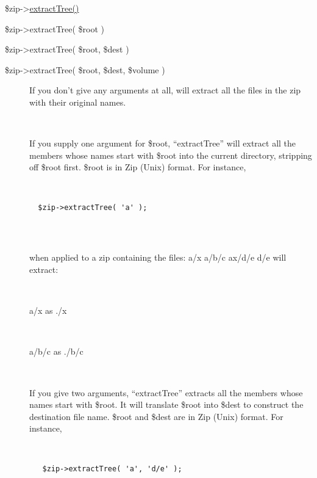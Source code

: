 \documentclass[]{article}
\renewcommand{\emph}[1]{\underline{#1}}
\begin{document}
\begin{description}
\item[\$zip-\textgreater{}\emph{extractTree()}]
\end{description}

\begin{description}
\item[\$zip-\textgreater{}extractTree( \$root )]
\end{description}

\begin{description}
\item[\$zip-\textgreater{}extractTree( \$root, \$dest )]
\end{description}

\begin{description}
\item[\$zip-\textgreater{}extractTree( \$root, \$dest, \$volume )]
If you don't give any arguments at all, will extract all the files in
the zip with their original names.

~

If you supply one argument for \$root, ``extractTree'' will extract all
the members whose names start with \$root into the current directory,
stripping off \$root first. \$root is in Zip (Unix) format. For
instance,

~

\begin{verbatim}
  $zip->extractTree( 'a' );
    
\end{verbatim}

~

when applied to a zip containing the files: a/x a/b/c ax/d/e d/e will
extract:

~

a/x as ./x

~

a/b/c as ./b/c

~

If you give two arguments, ``extractTree'' extracts all the members
whose names start with \$root. It will translate \$root into \$dest to
construct the destination file name. \$root and \$dest are in Zip (Unix)
format. For instance,

~

\begin{verbatim}
   $zip->extractTree( 'a', 'd/e' );
    
\end{verbatim}

~


\end{description}
\end{document}
